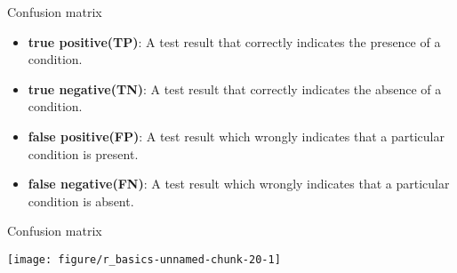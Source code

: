 \documentclass[10pt]{beamer}\usepackage[]{graphicx}\usepackage[]{xcolor}
\makeatletter
\def\maxwidth{ %
  \ifdim\Gin@nat@width>\linewidth
    \linewidth
  \else
    \Gin@nat@width
  \fi
}
\newenvironment{knitrout}{}{} %
\makeatother
\begin{document}
\begin{frame}[fragile]{Confusion matrix}
\begin{itemize}
\item \textbf{true positive(TP)}: A test result that correctly indicates the presence of a condition.
\item \textbf{true negative(TN)}: A test result that correctly indicates the absence of a condition.
\item \textbf{false positive(FP)}: A test result which wrongly indicates that a particular condition is present. 
\item \textbf{false negative(FN)}: A test result which wrongly indicates that a particular condition is absent. 
\end{itemize}
\end{frame}


\begin{frame}[fragile]{Confusion matrix}
\begin{knitrout}\footnotesize
{}\color{fgcolor}

{\centering \texttt{[image: figure/r\_basics-unnamed-chunk-20-1]} 

}


\end{knitrout}

\end{frame}

\end{document}
